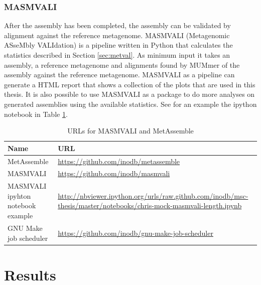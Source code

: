 \documentclass[a4paper,12pt]{report}
\begin{document}
\subsection{MASMVALI} After the assembly has been completed, the assembly can
be validated by alignment against the reference metagenome. MASMVALI
(Metagenomic ASseMbly VALIdation) is a pipeline written in Python that
calculates the statistics described in Section \ref{sec:metval}. As minimum
input it takes an assembly, a reference metagenome and alignments found by
MUMmer of the assembly against the reference metagenome. MASMVALI as a pipeline
can generate a HTML report that shows a collection of the plots that are used
in this thesis. It is also possible to use MASMVALI as a package to do more
analyses on generated assemblies using the available statistics. See for an
example the ipython notebook in Table \ref{tab:devsoft}.


\begin{table}[h]
\begin{tabular}{|l|p{9cm}|}
\hline
Name & URL \\ \hline
MetAssemble & \url{https://github.com/inodb/metassemble} \\ \hline
MASMVALI & \url{https://github.com/inodb/masmvali} \\ \hline
MASMVALI ipyhton notebook example & \url{http://nbviewer.ipython.org/urls/raw.github.com/inodb/msc-thesis/master/notebooks/chris-mock-masmvali-length.ipynb} \\ \hline
GNU Make job scheduler & \url{https://github.com/inodb/gnu-make-job-scheduler} \\ \hline
\end{tabular}
\caption{URLs for MASMVALI and MetAssemble}
\label{tab:devsoft}
\end{table}

\chapter{Results}
\end{document}
